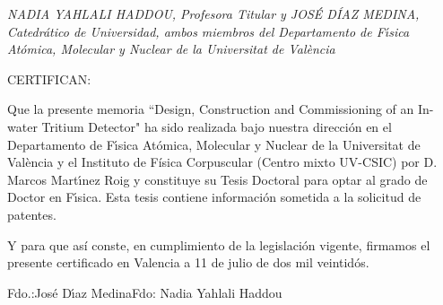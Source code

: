 

{\sl    NADIA YAHLALI HADDOU, Profesora Titular  y JOS\'E D\'IAZ MEDINA, Catedrático de  Universidad, ambos
miembros del Departamento de F\'{\i}sica At\'omica, Molecular y Nuclear
de la Universitat de València
\vspace{0.5cm}

        CERTIFICAN:
\vspace{0.7cm}

        Que la presente memoria ``Design, Construction and Commissioning of an In-water Tritium Detector"
ha sido realizada bajo nuestra direcci\'on en
el Departamento de F\'{\i}sica At\'omica, Molecular y Nuclear de la 
Universitat
de València y el Instituto de Física Corpuscular (Centro mixto UV-CSIC)  por D. Marcos Mart\'{\i}nez Roig y constituye su Tesis 
Doctoral para optar al grado de Doctor en F\'{\i}sica.
Esta tesis contiene información sometida a la solicitud de patentes.
\vspace{1.cm}

        Y para que así conste, en cumplimiento de la legislaci\'on vigente, firmamos
el presente certificado en Valencia a 11 de julio de dos mil veintidós.}
\vspace{1.cm}
\begin{center}
Fdo.:Jos\'e D\'{\i}az Medina\hfill Fdo: Nadia Yahlali Haddou
\end{center}